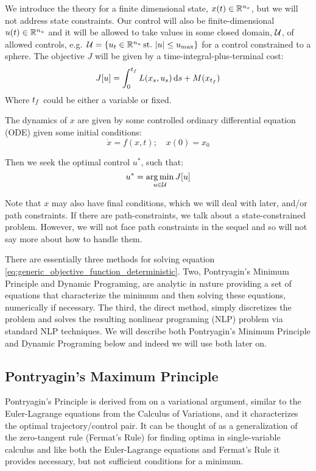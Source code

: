 We introduce the theory for a finite dimensional state, $x(t) \in { \mathbb{R} }^{n_x}$, but
we will not address state constraints. Our control will also be
finite-dimensional $u(t) \in { \mathbb{R} }^{n_u}$ and it will be allowed to take values in
some closed domain, ${ \mathcal{U} }$, of allowed controls, e.g.\ ${ \mathcal{U} } = \{ u_t
\in { \mathbb{R} }^{n_u} \, { \textrm{st.\ } } |u| \leq { u_{\textrm{max}} } \}$ for a control constrained to a sphere.
The objective $J$ will be given by a time-integral-plus-terminal cost:
\begin{equation}
J[u] = \int_0^{ t_f } L(x_s, u_s) \, \mathrm{d} s + M(x_{ t_f })
\label{eq:generic_objective_function_deterministic}
\end{equation}
Where ${ t_f }$ could be either a variable or fixed. 

The dynamics of $x$ are given by some controlled ordinary differential
equation (ODE) given some initial conditions:
\begin{equation}
\dot{x} = f(x,t); \quad x(0) = x_0
\label{eq:generic_dynamics_deterministic}
\end{equation}

Then we seek the optimal control $u^*$, such that:
\begin{equation}
u^* = \argmin_{u \in \Udomain} J[u]  
\label{eq:generic_objective_argmin}
\end{equation}

Note that $x$ may also have final conditions, which we will deal with later,
and/or path constraints. If there are path-constraints, we talk about a
state-constrained problem. However, we will not face path constraints in the
sequel and so will not say more about how to handle them.

There are essentially three methods for solving equation
\cref{eq:generic_objective_function_deterministic}. Two, Pontryagin's Minimum
Principle and Dynamic Programing, are analytic in nature providing a set of
equations that characterize the minimum and then solving these equations,
numerically if necessary. The third, the direct method, simply discretizes the
problem and solves the resulting nonlinear programing (NLP) problem via standard
NLP techniques. We will describe both Pontryagin's Minimum Principle and Dynamic
Programing below and indeed we will use both later on.

\subsection{Pontryagin's Maximum Principle}
Pontryagin's Principle is derived from on a variational argument, similar to the
Euler-Lagrange equations from the Calculus of Variations, and it characterizes
the optimal trajectory/control pair. It can be thought of as a generalization of
the zero-tangent rule (Fermat's Rule) for finding optima in single-variable
calculus and like both the Euler-Lagrange equations and Fermat's Rule it
provides necessary, but not sufficient conditions for a minimum.

